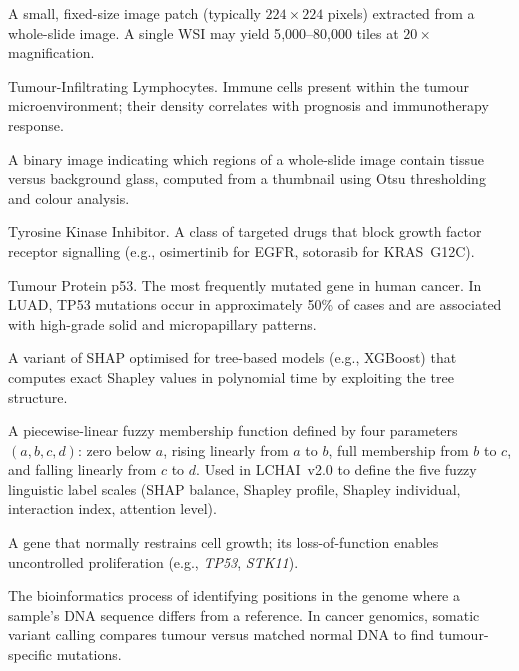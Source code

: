 \begin{description}[style=nextline,leftmargin=4cm]
\item[Tile] A small, fixed-size image patch (typically $224 \times 224$ pixels) extracted from a whole-slide image.  A single WSI may yield 5{,}000--80{,}000 tiles at $20\times$ magnification.


\item[TILs] Tumour-Infiltrating Lymphocytes.  Immune cells present within the tumour microenvironment; their density correlates with prognosis and immunotherapy response.


\item[Tissue mask] A binary image indicating which regions of a whole-slide image contain tissue versus background glass, computed from a thumbnail using Otsu thresholding and colour analysis.


\item[TKI] Tyrosine Kinase Inhibitor.  A class of targeted drugs that block growth factor receptor signalling (e.g., osimertinib for EGFR, sotorasib for KRAS~G12C).


\item[TP53] Tumour Protein p53.  The most frequently mutated gene in human cancer.  In LUAD, TP53 mutations occur in approximately 50\% of cases and are associated with high-grade solid and micropapillary patterns.


\item[TreeSHAP] A variant of SHAP optimised for tree-based models (e.g., XGBoost) that computes exact Shapley values in polynomial time by exploiting the tree structure.


\item[Trapezoidal membership function] A piecewise-linear fuzzy membership function defined by four parameters $(a, b, c, d)$: zero below $a$, rising linearly from $a$ to $b$, full membership from $b$ to $c$, and falling linearly from $c$ to $d$.  Used in LCHAI~v2.0 to define the five fuzzy linguistic label scales (SHAP balance, Shapley profile, Shapley individual, interaction index, attention level).

\item[Tumour suppressor] A gene that normally restrains cell growth; its loss-of-function enables uncontrolled proliferation (e.g., \emph{TP53}, \emph{STK11}).


\item[Variant calling] The bioinformatics process of identifying positions in the genome where a sample's DNA sequence differs from a reference.  In cancer genomics, somatic variant calling compares tumour versus matched normal DNA to find tumour-specific mutations.



\end{description}
